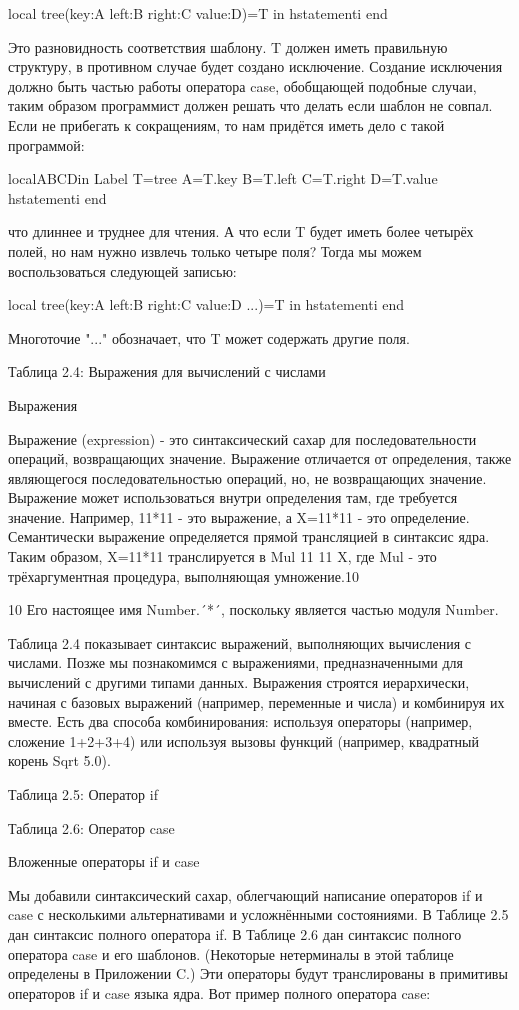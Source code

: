 local
tree(key:A left:B right:C value:D)=T
in
hstatementi
end

Это разновидность соответствия шаблону. T должен иметь правильную структуру, в противном случае будет создано исключение. Создание исключения должно быть частью работы оператора case, обобщающей подобные случаи, таким образом программист должен решать что делать если шаблон не совпал. Если не прибегать к сокращениям, то нам придётся иметь дело с такой программой:

localABCDin
{Label T}=tree
A=T.key
B=T.left
C=T.right
D=T.value
hstatementi
end

что длиннее и труднее для чтения. А что если T будет иметь более четырёх полей, но нам нужно извлечь только четыре поля? Тогда мы можем воспользоваться следующей записью:

local
tree(key:A left:B right:C value:D ...)=T
in
hstatementi
end

Многоточие "..." обозначает, что T может содержать другие поля.

Таблица 2.4: Выражения для вычислений с числами

Выражения

Выражение (expression) - это синтаксический сахар для последовательности операций, возвращающих значение. Выражение отличается от определения, также являющегося последовательностью операций, но, не возвращающих значение. Выражение может использоваться внутри определения там, где требуется значение. Например, 11*11 - это выражение, а X=11*11 - это определение. Семантически выражение определяется прямой трансляцией в синтаксис ядра. Таким образом, X=11*11 транслируется в {Mul 11 11 X}, где Mul - это трёхаргументная процедура, выполняющая умножение.10

10 Его настоящее имя Number.´*´, поскольку является частью модуля Number.

Таблица 2.4 показывает синтаксис выражений, выполняющих вычисления с числами. Позже мы познакомимся с выражениями, предназначенными для вычислений с другими типами данных. Выражения строятся иерархически, начиная с базовых выражений (например, переменные и числа) и комбинируя их вместе. Есть два способа комбинирования: используя операторы (например, сложение 1+2+3+4) или используя вызовы функций (например, квадратный корень {Sqrt 5.0}).

Таблица 2.5: Оператор if

Таблица 2.6: Оператор case

Вложенные операторы if и case

Мы добавили синтаксический сахар, облегчающий написание операторов if и case с несколькими альтернативами и усложнёнными состояниями. В Таблице 2.5 дан синтаксис полного оператора if. В Таблице 2.6 дан синтаксис полного оператора case и его шаблонов. (Некоторые нетерминалы в этой таблице определены в Приложении C.) Эти операторы будут транслированы в примитивы операторов if и case языка ядра. Вот пример полного оператора case:

